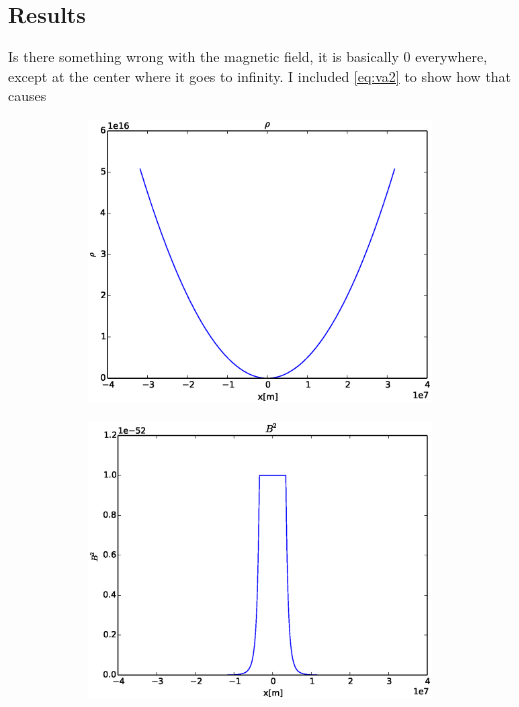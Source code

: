\documentclass[x11names]{article}
\begin{document}
\subsection{Results}
  Is there something wrong with the magnetic field, it is basically \(0\) everywhere, except at the center where it goes to infinity. I included \cref{eq:va2} to show how that causes 
  \begin{figure}
    \centering
    \begin{subfigure}{0.45\linewidth}
      \includegraphics[width = \textwidth]{../source/rho}
    \end{subfigure}
    \begin{subfigure}{0.45\linewidth}
      \includegraphics[width = \textwidth]{../source/b2}

\end{subfigure}
\end{figure}
\end{document}
